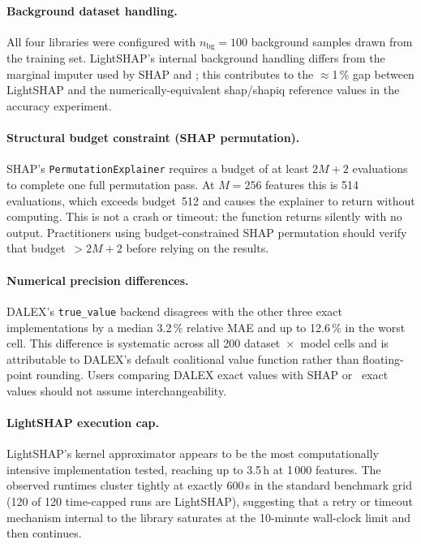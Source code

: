 \paragraph{Background dataset handling.}
All four libraries were configured with $n_\text{bg} = 100$ background
samples drawn from the training set.
LightSHAP's internal background handling differs from the marginal imputer
used by SHAP and \shapiq; this contributes to the $\approx$1\,\% gap
between LightSHAP and the numerically-equivalent shap/shapiq reference
values in the accuracy experiment.

\paragraph{Structural budget constraint (SHAP permutation).}
SHAP's \texttt{Permutation\-Explainer} requires a budget of at least
$2M + 2$ evaluations to complete one full permutation pass.
At $M = 256$ features this is 514 evaluations, which exceeds budget~512
and causes the explainer to return without computing.
This is not a crash or timeout: the function returns silently with no
output.
Practitioners using budget-constrained SHAP permutation should verify that
budget~$> 2M + 2$ before relying on the results.

\paragraph{Numerical precision differences.}
DALEX's \texttt{true\_value} backend disagrees with the other three exact
implementations by a median 3.2\,\% relative MAE and up to 12.6\,\%
in the worst cell.
This difference is systematic across all 200 dataset~$\times$~model
cells and is attributable to DALEX's default coalitional value function
rather than floating-point rounding.
Users comparing DALEX exact values with SHAP or \shapiq\ exact values
should not assume interchangeability.

\paragraph{LightSHAP execution cap.}
LightSHAP's kernel approximator appears to be the most computationally
intensive implementation tested, reaching up to 3.5\,h at 1\,000 features.
The observed runtimes cluster tightly at exactly 600\,s in the standard
benchmark grid (120 of 120 time-capped runs are LightSHAP), suggesting
that a retry or timeout mechanism internal to the library saturates at
the 10-minute wall-clock limit and then continues.
